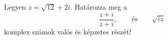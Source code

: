 \documentclass[11pt]{scrartcl}
\begin{document}
Legyen $z = \sqrt{12} + 2i$. Határozza meg a
\[
	\frac{z + i}{\overline{z} + i}, \qquad \text{és} \qquad \sqrt{iz}
\]
komplex számok valós és képzetes részét!
\end{document}
